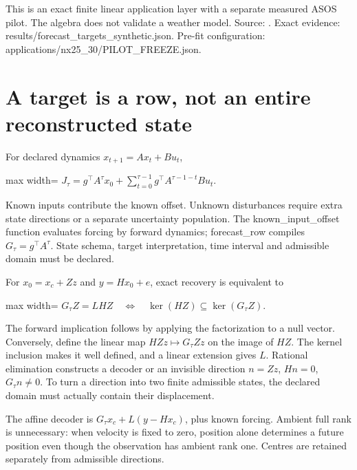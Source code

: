 \documentclass[
  11pt,
  a4paper,
]{report}
\let\singularitytexttt\texttt
\renewcommand{\texttt}[1]{\singularitytexttt{\seqsplit{#1}}}
\begin{document}
This is an exact finite linear application layer with a separate
measured ASOS pilot. The algebra does not validate a weather model.
Source: \texttt{src/singularity/forecast\_targets.py}. Exact evidence:
results/forecast\_targets\_synthetic.json. Pre-fit configuration:
applications/nx25\_30/PILOT\_FREEZE.json.

\hypertarget{a-target-is-a-row-not-an-entire-reconstructed-state}{%
\section{A target is a row, not an entire reconstructed
state}\label{a-target-is-a-row-not-an-entire-reconstructed-state}}

For declared dynamics \(x_{t+1}=Ax_t+Bu_t\), \begin{center}
\begin{adjustbox}{max width=\linewidth}
$\displaystyle
J_\tau=g^\top A^\tau x_0+
\sum_{t=0}^{\tau-1}g^\top A^{\tau-1-t}Bu_t.
$
\end{adjustbox}
\end{center} Known inputs contribute the known offset. Unknown disturbances
require extra state directions or a separate uncertainty population. The
known\_input\_offset function evaluates forcing by forward dynamics;
forecast\_row compiles \(G_\tau=g^\top A^\tau\). State schema, target
interpretation, time interval and admissible domain must be declared.

For \(x_0=x_c+Zz\) and \(y=Hx_0+e\), exact recovery is equivalent to \begin{center}
\begin{adjustbox}{max width=\linewidth}
$\displaystyle
G_\tau Z=LHZ
\quad\Longleftrightarrow\quad
\ker(HZ)\subseteq\ker(G_\tau Z).
$
\end{adjustbox}
\end{center} The forward implication follows by applying the factorization to a
null vector. Conversely, define the linear map \(HZz\mapsto G_\tau Zz\)
on the image of \(HZ\). The kernel inclusion makes it well defined, and
a linear extension gives \(L\). Rational elimination constructs a
decoder or an invisible direction \(n=Zz\), \(Hn=0\), \(G_\tau n\ne0\).
To turn a direction into two finite admissible states, the declared
domain must actually contain their displacement.

The affine decoder is \(G_\tau x_c+L(y-Hx_c)\), plus known forcing.
Ambient full rank is unnecessary: when velocity is fixed to zero,
position alone determines a future position even though the observation
has ambient rank one. Centres are retained separately from admissible
directions.
\end{document}

